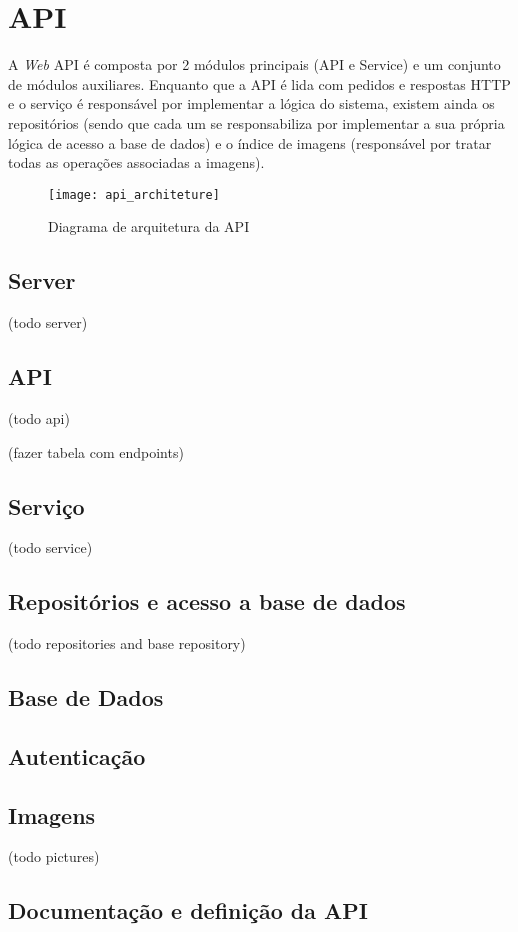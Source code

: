 \section{API}

A \textit{Web} API é composta por 2 módulos principais (API e Service) e um conjunto de módulos auxiliares. Enquanto que a API é lida com pedidos e respostas HTTP e o serviço é responsável por implementar a lógica do sistema, existem ainda os repositórios (sendo que cada um se responsabiliza por implementar a sua própria lógica de acesso a base de dados) e o índice de imagens (responsável por tratar todas as operações associadas a imagens).

\begin{figure}[h]
	\centering
	\texttt{[image: api\_architeture]}
	\caption{Diagrama de arquitetura da API}
\end{figure}

\subsection{Server}
(todo server)

\subsection{API}
(todo api)

(fazer tabela com endpoints)

\subsection{Serviço}
(todo service)

\subsection{Repositórios e acesso a base de dados}
(todo repositories and base repository)

\subsection{Base de Dados}

\subsection{Autenticação}

\subsection{Imagens}
(todo pictures)

\subsection{Documentação e definição da API}